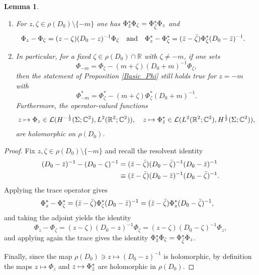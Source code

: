 \documentclass[11pt,a4paper,reqno,oneside]{amsproc}
\def \rr {{\mathbb R}}
\numberwithin{equation}{section}
\newtheorem{lemma}[definition]{Lemma}
\begin{document}
\begin{lemma}\label{Phi_identities} 
\begin{enumerate}
\item For $z,\zeta\in\rho(D_0)\setminus\{-m\}$ one has $\Phi_{\Bar{z}}^\ast \Phi_{\zeta}= \Phi_{\Bar\zeta}^\ast\Phi_{z}$ and 
\begin{align}\label{Phi_identity}
\begin{split}
    \Phi_z-\Phi_{\zeta}=(z-\zeta)(D_0 -z)^{-1}\Phi_{\zeta}\quad\text{and} \quad  \Phi_z^\ast-\Phi_{\zeta}^\ast&=(\Bar{z}-\Bar{\zeta})\Phi_{\zeta}^\ast(D_0 -\Bar{z})^{-1}.
    \end{split}
\end{align} 
\item In particular, for a fixed  $\zeta\in\rho(D_0)\cap\rr$ with $\zeta\neq-m$,  if one sets 
\[
 \Phi_{-m}=\Phi_{\zeta}-(m+\zeta)(D_0 +m)^{-1}\Phi_{\zeta},
 \]
  then the statement of Proposition \ref{Basic_Phi} still holds true for $z=-m$ with 
\[
 \Phi_{-m}^\ast= \Phi_{\zeta}^\ast-(m+ \zeta)\Phi_{\zeta}^\ast(D_0 +m)^{-1}.
 \]
  Furthermore, the operator-valued functions  
\begin{align*} 
z \mapsto \Phi_z \in \mathcal L(H^{-\frac{1}{2}}(\Sigma;\mathbb{C}^2), L^2(\rr^2;\mathbb{C}^2) ),\quad   z \mapsto \Phi_{\Bar{z}}^\ast \in \mathcal L(L^2(\rr^2;\mathbb{C}^2), H^{\frac{1}{2}}(\Sigma;\mathbb{C}^2)) ,
\end{align*}
are holomorphic on $\rho(D_0)$.
\end{enumerate}
\end{lemma}
\begin{proof}Fix $z,\zeta\in\rho(D_0)\setminus\{-m\}$ and recall the resolvent identity 
\begin{align*}
(D_0 -\Bar{z})^{-1}-(D_0 -\zeta)^{-1}&=(\Bar{z}-\Bar{\zeta})(D_0 -\Bar{\zeta})^{-1}(D_0 -\Bar{z})^{-1}\\
&\equiv(\Bar{z}-\Bar{\zeta})(D_0 -\Bar{z})^{-1}(D_0 -\Bar{\zeta})^{-1}.
\end{align*}
Applying the trace operator gives 
\begin{align*}
    \Phi_z^\ast-\Phi_{\zeta}^\ast&=(\Bar{z}-\Bar{\zeta})\Phi_{\zeta}^\ast(D_0 -\Bar{z})^{-1}=(\Bar{z}-\Bar{\zeta})\Phi_{z}^\ast(D_0 -\Bar{\zeta})^{-1},
\end{align*}
and taking the adjoint yields the identity   
\[
\Phi_z-\Phi_{\zeta}=(z-\zeta)(D_0 -z)^{-1}\Phi_{\zeta}=(z-\zeta)(D_0 -\zeta)^{-1}\Phi_{z},
\]
and applying again the trace gives the identity $\Phi_{\Bar{z}}^\ast \Phi_{\zeta}= \Phi_{\Bar\zeta}^\ast\Phi_{z}$.

Finally, since the map $\rho(D_0) \ni z \mapsto (D_0 -z)^{-1}$ is holomorphic,  by definition the maps $z\mapsto \Phi_z$ and $z\mapsto \Phi_{\Bar{z}}^\ast $ are holomorphic in $\rho(D_0)$.
\end{proof}
\end{document}
